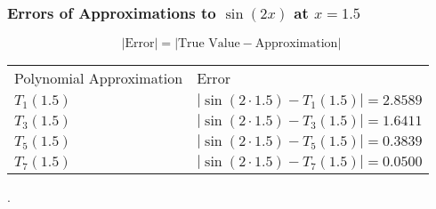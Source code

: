 \documentclass{beamer}
\begin{document}
\begin{frame}
\frametitle{Errors of Approximations to $\sin(2x)$ at $x = 1.5$}

\begin{equation}
	|\textrm{Error}| = |\textrm{True Value} - \textrm{Approximation}|
\end{equation}
\vspace{0.7 cm}

\begin{tabular}{ll}
	\vspace{0.2 cm}
	\hspace{0.01 cm}Polynomial Approximation & \hspace{0.3 cm} Error \\
	\vspace{0.2 cm}
	$T_1(1.5)$ 	&	$|\sin(2 \cdot 1.5) - T_1(1.5) |= 2.8589$ 	\\
	\vspace{0.2 cm}
	$T_3(1.5)$ 	&	$|\sin(2 \cdot 1.5) - T_3(1.5) |= 1.6411$ 	\\
	\vspace{0.2 cm}
	$T_5(1.5)$ 	&	$|\sin(2 \cdot 1.5) - T_5(1.5) |= 0.3839$ 	\\
	\vspace{0.2 cm}
	$T_7(1.5)$ 	&	$|\sin(2 \cdot 1.5) - T_7(1.5) |= 0.0500$ 	\\
\end{tabular}.




\vspace{6.5 cm}
\end{frame}
\end{document}
